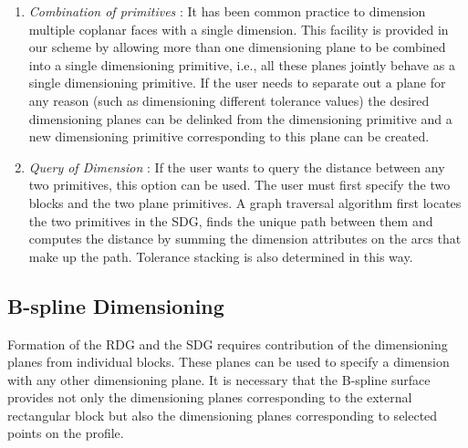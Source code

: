 \begin{enumerate}
    \item
    {\em Combination of primitives} :
    It has been common practice to dimension multiple coplanar faces 
    with a single dimension. This facility is provided in our scheme
	by allowing more than one dimensioning plane to be combined into
	a single dimensioning primitive, i.e., all these planes jointly
    behave as a single dimensioning primitive. If the user needs to
    separate out a plane for any reason (such as dimensioning different 
	tolerance values) the desired dimensioning planes can be delinked from the
    dimensioning primitive and a new dimensioning primitive corresponding to
	this plane can be created.

    \item
    {\em Query of Dimension} :
	If the user wants to query the distance between any two primitives, this 
	option
	can be used. The user must first specify the two blocks and the two plane
	primitives. A graph traversal algorithm first locates the two primitives
	in the SDG, 
	finds the unique path between them and computes the distance by summing
	the dimension attributes on the arcs that make up the path. Tolerance
	stacking is also determined in this way.
	\end{enumerate}

	\subsection{B-spline Dimensioning}
	\label{dimpts}

	Formation of the RDG and the SDG requires contribution of the dimensioning
	planes from individual blocks. These planes can be used to specify a 
	dimension with any other dimensioning plane. It is necessary that the
	B-spline surface provides not only the dimensioning planes corresponding 
	to the
	external rectangular block but also the dimensioning planes corresponding
	to selected points on the profile. 

